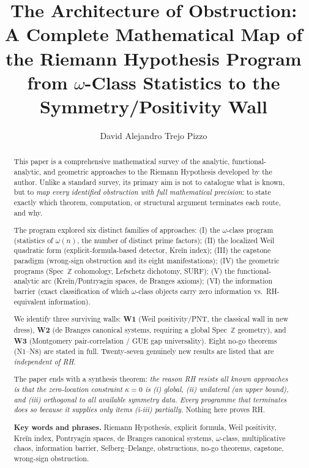 \documentclass[11pt]{amsart}
\title[The Architecture of Obstruction]{The Architecture of Obstruction:\\ A Complete Mathematical Map of the Riemann Hypothesis Program from $\omega$-Class Statistics to the Symmetry/Positivity Wall}
\author{David Alejandro Trejo Pizzo}
\theoremstyle{definition}
\theoremstyle{remark}
\newcommand{\om}{\omega}
\newcommand{\kap}{\kappa}
\begin{document}
\maketitle

\begin{abstract}
This paper is a comprehensive mathematical survey of the analytic, functional-analytic,
and geometric approaches to the Riemann Hypothesis developed by the author.
Unlike a standard survey, its primary aim is not to catalogue what is known, but to
\emph{map every identified obstruction with full mathematical precision}: to state exactly
which theorem, computation, or structural argument terminates each route, and why.

The program explored six distinct families of approaches:
(I) the $\om$-class program (statistics of $\om(n)$, the number of distinct prime factors);
(II) the localized Weil quadratic form (explicit-formula-based detector, Kreĭn index);
(III) the capstone paradigm (wrong-sign obstruction and its eight manifestations);
(IV) the geometric programs (Spec~$\mathbb{Z}$ cohomology, Lefschetz dichotomy, SURF);
(V) the functional-analytic arc (Kreĭn/Pontryagin spaces, de Branges axioms);
(VI) the information barrier (exact classification of which $\om$-class objects carry
zero information vs.\ RH-equivalent information).

We identify three surviving walls: \textbf{W1} (Weil positivity/PNT, the classical wall
in new dress), \textbf{W2} (de Branges canonical systems, requiring a global
Spec~$\mathbb{Z}$ geometry), and \textbf{W3} (Montgomery pair-correlation / GUE gap
universality).  Eight no-go theorems (N1--N8) are stated in full.  Twenty-seven
genuinely new results are listed that are \emph{independent of RH}.

The paper ends with a synthesis theorem: \emph{the reason RH resists all known
approaches is that the zero-location constraint $\kap=0$ is (i) global, (ii) unilateral
(an upper bound), and (iii) orthogonal to all available symmetry data.  Every programme
that terminates does so because it supplies only items (i-iii) partially.}  Nothing here
proves RH.

\medskip
\noindent\textbf{Key words and phrases.}
Riemann Hypothesis, explicit formula, Weil positivity, Kreĭn index, Pontryagin spaces,
de Branges canonical systems, $\om$-class, multiplicative chaos, information barrier,
Selberg--Delange, obstructions, no-go theorems, capstone, wrong-sign obstruction.
\end{abstract}
\end{document}

